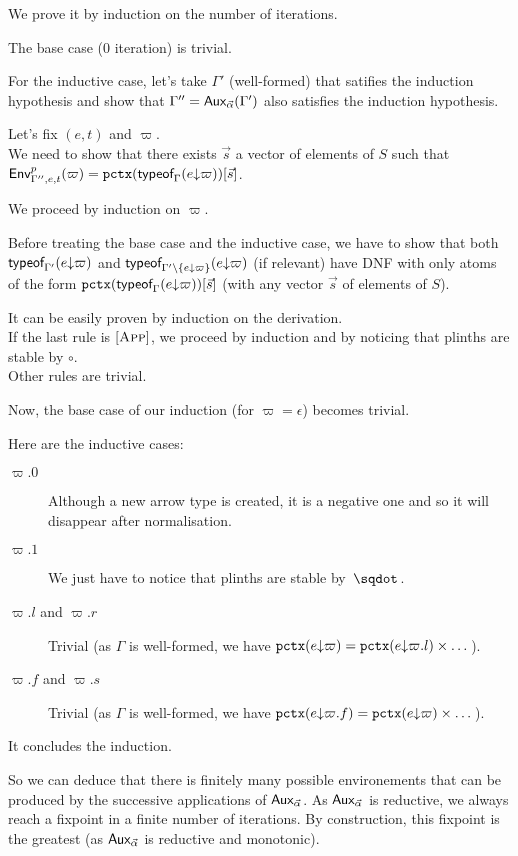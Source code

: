\documentclass[a4paper]{article}
\theoremstyle{definition}
\begin{document}
    We prove it by induction on the number of iterations.

    The base case (0 iteration) is trivial.

    For the inductive case, let's take $\Gamma'$ (well-formed) that satifies the induction hypothesis
    and show that $\Gamma'' = \textsf{Aux}_{\vec \alpha}(\Gamma')$ also satisfies the induction hypothesis.

    Let's fix $(e,t)$ and $\varpi$.\\
    We need to show that there exists $\vec s$ a vector of elements of $S$ such that $\textsf{Env}^{p}_{\Gamma'',e,t} (\varpi) = \texttt{pctx}(\textsf{typeof}_{\Gamma}(e{\downarrow}\varpi))[\vec s]$.
    
    We proceed by induction on $\varpi$.

    Before treating the base case and the inductive case, we have to show that both $\textsf{typeof}_{\Gamma'}(e{\downarrow}\varpi)$
    and $\textsf{typeof}_{\Gamma'\setminus\{e{\downarrow}\varpi\}}(e{\downarrow}\varpi)$ (if relevant) have DNF with only atoms of the form
    $\texttt{pctx}(\textsf{typeof}_{\Gamma}(e{\downarrow}\varpi))[\vec s]$ (with any vector $\vec s$ of elements of $S$).

    It can be easily proven by induction on the derivation.\\
    If the last rule is $[\textsc{App}]$, we proceed by induction and by noticing that plinths are stable by $\circ$.\\
    Other rules are trivial.

    Now, the base case of our induction (for $\varpi=\epsilon$) becomes trivial.

    Here are the inductive cases:
    \begin{description}
      \item[$\varpi.0$] Although a new arrow type is created, it is a negative one and so it will disappear after normalisation.
      \item[$\varpi.1$] We just have to notice that plinths are stable by $\worra {} {}$.
      \item[$\varpi.l$ and $\varpi.r$] Trivial (as $\Gamma$ is well-formed, we have $\texttt{pctx}(e{\downarrow}\varpi) = \texttt{pctx}(e{\downarrow}\varpi.l)\times \dots$).
      \item[$\varpi.f$ and $\varpi.s$] Trivial (as $\Gamma$ is well-formed, we have $\texttt{pctx}(e{\downarrow}\varpi.f) = \texttt{pctx}(e{\downarrow}\varpi)\times \dots$).
    \end{description}

    It concludes the induction.

    So we can deduce that there is finitely many possible environements that can be produced by the successive applications of $\textsf{Aux}_{\vec \alpha}$.
    As $\textsf{Aux}_{\vec \alpha}$ is reductive, we always reach a fixpoint in a finite number of iterations.
    By construction, this fixpoint is the greatest (as $\textsf{Aux}_{\vec \alpha}$ is reductive and monotonic).
\end{document}
